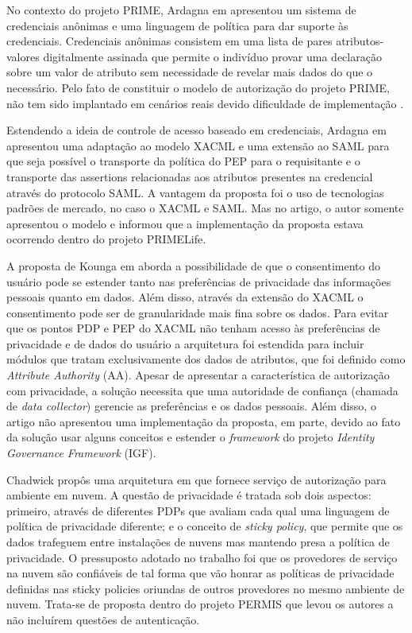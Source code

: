 \documentclass{doublecol-new}
\begin{document}
No contexto do projeto PRIME, Ardagna em \cite{ardagna2010exploiting} apresentou um sistema de credenciais anônimas e uma linguagem de política para dar suporte às credenciais. Credenciais anônimas consistem em uma lista de pares atributos-valores digitalmente assinada que permite o indivíduo provar uma declaração sobre um valor de atributo sem necessidade de revelar mais dados do que o necessário. Pelo fato de constituir o modelo de autorização do projeto PRIME, não tem sido implantado em cenários reais devido dificuldade de implementação \cite{ardagna2010enabling}.


Estendendo a ideia de controle de acesso baseado em credenciais, Ardagna em \cite{ardagna2010enabling} apresentou uma adaptação ao modelo XACML e uma extensão ao SAML para que seja possível o transporte da política do PEP para o requisitante e o transporte das assertions relacionadas aos atributos presentes na credencial através do protocolo SAML. A vantagem da proposta foi o uso de tecnologias padrões de mercado, no caso o XACML e SAML. Mas no artigo, o autor somente apresentou o modelo e informou que a implementação da proposta estava ocorrendo dentro do projeto PRIMELife. 

A proposta de Kounga em \cite{kounga2010extending} aborda a possibilidade de que o consentimento do usuário pode se estender tanto nas preferências de privacidade das informações pessoais quanto em dados. Além disso, através da extensão do XACML o consentimento pode ser de granularidade mais fina sobre os dados. Para evitar que os pontos PDP e PEP do XACML não tenham acesso às preferências de privacidade e de dados do usuário a arquitetura foi estendida para incluir módulos que tratam exclusivamente dos dados de atributos, que foi definido como \textit{Attribute Authority} (AA). Apesar de apresentar a característica de autorização com privacidade, a solução necessita que uma autoridade de confiança (chamada de \textit{data collector}) gerencie as preferências e os dados pessoais. Além disso, o artigo não apresentou uma implementação da proposta, em parte, devido ao fato da solução usar alguns conceitos e estender o \textit{framework} do projeto \textit{Identity Governance Framework} (IGF).

Chadwick propôs uma arquitetura em \cite{chadwick2012privacy} que fornece serviço de autorização para ambiente em nuvem. A questão de privacidade é tratada sob dois aspectos: primeiro, através de diferentes PDPs que avaliam cada qual uma linguagem de política de privacidade diferente; e o conceito de \textit{sticky policy}, que permite que os dados trafeguem entre instalações de nuvens mas mantendo presa a política de privacidade. O pressuposto adotado no trabalho foi que os provedores de serviço na nuvem são confiáveis de tal forma que vão honrar as políticas de privacidade definidas nas sticky policies oriundas de outros provedores no mesmo ambiente de nuvem. Trata-se de proposta dentro do projeto PERMIS que levou os autores a não incluírem questões de autenticação.
\end{document}
